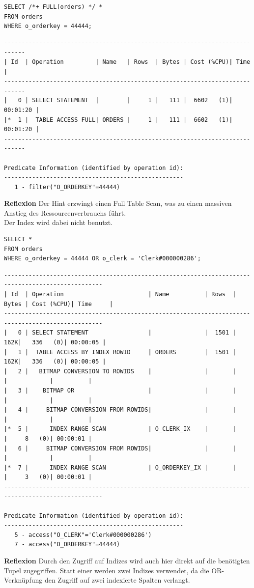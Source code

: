 \documentclass[10pt]{article}
\begin{document}
\begin{lstlisting}[style=sql]
SELECT /*+ FULL(orders) */ *
FROM orders
WHERE o_orderkey = 44444;
\end{lstlisting}
\begin{lstlisting}[style=queryexecutionplan]
----------------------------------------------------------------------------
| Id  | Operation         | Name   | Rows  | Bytes | Cost (%CPU)| Time     |
----------------------------------------------------------------------------
|   0 | SELECT STATEMENT  |        |     1 |   111 |  6602   (1)| 00:01:20 |
|*  1 |  TABLE ACCESS FULL| ORDERS |     1 |   111 |  6602   (1)| 00:01:20 |
----------------------------------------------------------------------------

Predicate Information (identified by operation id):
---------------------------------------------------
   1 - filter("O_ORDERKEY"=44444)
\end{lstlisting}
\textbf{Reflexion} \newline
Der Hint erzwingt einen Full Table Scan, was zu einen massiven Anstieg des Ressourcenverbrauchs führt.\\
Der Index wird dabei nicht benutzt.
\newpage
\begin{lstlisting}[style=sql]
SELECT *
FROM orders
WHERE o_orderkey = 44444 OR o_clerk = 'Clerk#000000286';
\end{lstlisting}
\begin{lstlisting}[style=queryexecutionplanSmall]
--------------------------------------------------------------------------------------------------
| Id  | Operation                        | Name          | Rows  | Bytes | Cost (%CPU)| Time     |
--------------------------------------------------------------------------------------------------
|   0 | SELECT STATEMENT                 |               |  1501 |   162K|   336   (0)| 00:00:05 |
|   1 |  TABLE ACCESS BY INDEX ROWID     | ORDERS        |  1501 |   162K|   336   (0)| 00:00:05 |
|   2 |   BITMAP CONVERSION TO ROWIDS    |               |       |       |            |          |
|   3 |    BITMAP OR                     |               |       |       |            |          |
|   4 |     BITMAP CONVERSION FROM ROWIDS|               |       |       |            |          |
|*  5 |      INDEX RANGE SCAN            | O_CLERK_IX    |       |       |     8   (0)| 00:00:01 |
|   6 |     BITMAP CONVERSION FROM ROWIDS|               |       |       |            |          |
|*  7 |      INDEX RANGE SCAN            | O_ORDERKEY_IX |       |       |     3   (0)| 00:00:01 |
--------------------------------------------------------------------------------------------------

Predicate Information (identified by operation id):
---------------------------------------------------
   5 - access("O_CLERK"='Clerk#000000286')
   7 - access("O_ORDERKEY"=44444)
\end{lstlisting}
\textbf{Reflexion} \newline
Durch den Zugriff auf Indizes wird auch hier direkt auf die benötigten Tupel zugegriffen.
Statt einer werden zwei Indizes verwendet, da die OR-Verknüpfung den Zugriff auf zwei indexierte Spalten verlangt.
\end{document}
